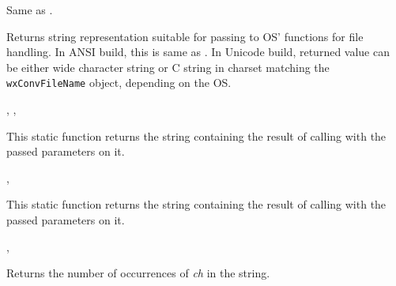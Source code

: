 Same as .

\label{wxstringfnstr}




Returns string representation suitable for passing to OS' functions for
file handling. In ANSI build, this is same as .
In Unicode build, returned value can be either wide character string
or C string in charset matching the {\tt wxConvFileName} object, depending on
the OS.


,
, 

\label{wxstringformat}


This static function returns the string containing the result of calling 
 with the passed parameters on it.


, 

\label{wxstringformatv}


This static function returns the string containing the result of calling 
 with the passed parameters on it.


, 

\label{wxstringfreq}


Returns the number of occurrences of {\it ch} in the string.

\label{wxstringfromascii}


